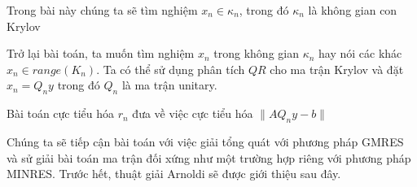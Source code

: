 Trong bài này chúng ta sẽ tìm nghiệm $x_n \in \kappa_n$, trong đó $\kappa_n$ là không gian con Krylov



Trở lại bài toán, ta muốn tìm nghiệm $x_n$ trong không gian $\kappa_n$ hay nói 
các khác $x_n \in range(K_n)$. Ta có thể sử dụng phân tích $QR$ cho ma trận Krylov và
đặt $x_n = Q_ny$ trong đó $Q_n$ là ma trận unitary. 

Bài toán cực tiểu hóa $r_n$ đưa về việc cực tiểu hóa $\|AQ_ny - b\|$


Chúng ta sẽ tiếp cận bài toán với việc giải tổng quát với phương pháp GMRES 
và sử giải bài toán ma trận đối xứng như một trường hợp riêng với phương pháp MINRES.
Trước hết, thuật giải Arnoldi sẽ được giới thiệu sau đây.